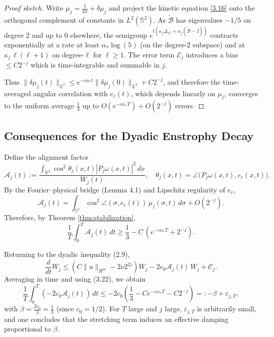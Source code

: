 \documentclass[11pt]{article}
\begin{document}
\begin{proof}[Proof sketch]
Write $\mu_j = \frac{1}{4\pi} + \delta\mu_j$ and project the kinetic equation \eqref{3.16} onto the orthogonal complement of constants in $L^2(\mathbb{S}^2)$. As $\tilde{\mathcal{B}}$ has eigenvalues $-1/5$ on degree 2 and up to $0$ elsewhere, the semigroup $e^{t(\kappa_j \Delta_{\mathbb{S}^2} + \alpha_j(\tilde{\mathcal{B}} - I))}$ contracts exponentially at a rate at least $\alpha_* \log(5)$ (on the degree-$2$ subspace) and at $\kappa_j \,\ell(\ell+1)$ on degree-$\ell$ for $\ell \geq 1$. The error term $\mathcal{E}_j$ introduces a bias $\leq C 2^{-j}$ which is time-integrable and summable in $j$.

Thus $\|\delta\mu_j(t)\|_{L^2} \leq e^{-c \alpha_* t} \|\delta\mu_j(0)\|_{L^2} + C 2^{-j}$, and therefore the time-averaged angular correlation with $e_c(t)$, which depends linearly on $\mu_j$, converges to the uniform average $\frac{1}{3}$ up to $O(e^{-c\alpha_* T}) + O(2^{-j})$ errors.
\end{proof}

\subsection{Consequences for the Dyadic Enstrophy Decay}

Define the alignment factor
\[
\mathcal{A}_j(t) := \frac{\int_{\mathbb{R}^3} \cos^2 \theta_j(x,t) |P_j \omega(x,t)|^2 \, dx}{W_j(t)}, \quad 
\theta_j(x,t) = \angle\big( P_j \omega(x,t), e_c(x,t) \big). \tag{3.20}
\]
By the Fourier--physical bridge (Lemma 4.1) and Lipschitz regularity of $e_c$, 
\begin{equation}
\mathcal{A}_j(t) = \int_{\mathbb{S}^2} \cos^2 \angle(\sigma, e_c(t)) \, \mu_j(\sigma, t) \, d\sigma + O(2^{-j}). \tag{3.21}
\end{equation}
Therefore, by Theorem \ref{thm:stabilization},
\[
\frac{1}{T} \int_0^T \mathcal{A}_j(t) \, dt \geq \frac{1}{3} - C \, \left( e^{-c \alpha_* T} + 2^{-j} \right). \tag{3.22}
\]

Returning to the dyadic inequality (2.9),
\[
\frac{d}{dt} W_j \leq \left( C \|u\|_{H^m} - 2\nu 2^{2j}\right) W_j 
- 2 c_0 \mathcal{A}_j(t) \, W_j
+ \mathcal{C}_j. \tag{3.23}
\]
Averaging in time and using (3.22), we obtain
\[
\frac{1}{T} \int_0^T \left( - 2 c_0 \mathcal{A}_j(t) \right) \, dt 
\leq - 2 c_0 \left( \frac{1}{3} - C e^{-c\alpha_* T} - C 2^{-j} \right) =: - \beta + \varepsilon_{j,T}, \tag{3.24}
\]
with $\beta = \frac{2 c_0}{3} = \frac{1}{3}$ (since $c_0 = 1/2$). For $T$ large and $j$ large, $\varepsilon_{j,T}$ is arbitrarily small, and one concludes that the stretching term induces an effective damping proportional to $\beta$.
\end{document}
